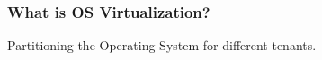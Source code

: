 \begin{frame}
\frametitle{What is OS Virtualization?}
Partitioning the Operating System for different tenants.
\end{frame}
